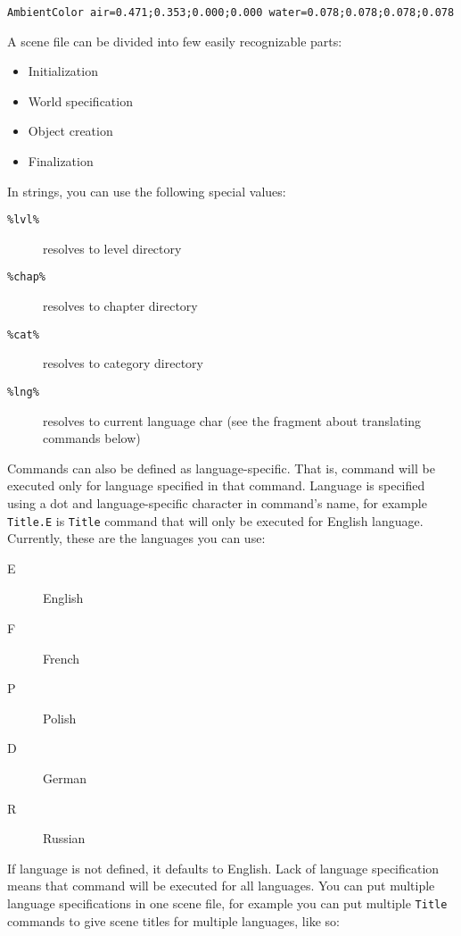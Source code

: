 \begin{verbatim}
AmbientColor air=0.471;0.353;0.000;0.000 water=0.078;0.078;0.078;0.078
\end{verbatim}

A scene file can be divided into few easily recognizable parts:

\begin{itemize}
    \item Initialization
    \item World specification
    \item Object creation
    \item Finalization
\end{itemize}

In strings, you can use the following special values:

\begin{description}
    \item[\texttt{\%lvl\%}] resolves to level directory
    \item[\texttt{\%chap\%}] resolves to chapter directory
    \item[\texttt{\%cat\%}] resolves to category directory 
    \item[\texttt{\%lng\%}] resolves to current language char (see the fragment about translating commands below)
\end{description}

Commands can also be defined as language-specific. That is, command will be executed only for language specified in that command. Language is specified using a dot and language-specific character in command's name, for example \texttt{Title.E} is \texttt{Title} command that will only be executed for English language. Currently, these are the languages you can use:

\begin{description}
    \item[E] English
    \item[F] French
    \item[P] Polish
    \item[D] German
    \item[R] Russian
\end{description}

If language is not defined, it defaults to English. Lack of language specification means that command will be executed for all languages. You can put multiple language specifications in one scene file, for example you can put multiple \texttt{Title} commands to give scene titles for multiple languages, like so:

